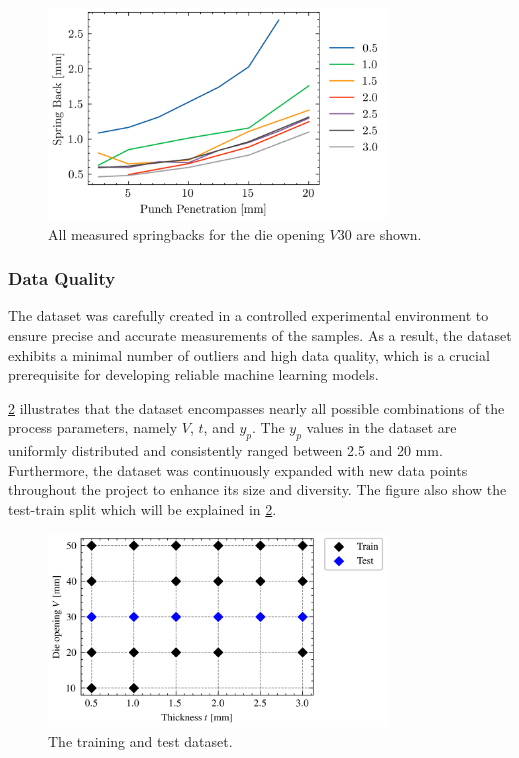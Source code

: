 {\begin{figure}[h]
    \begin{tcolorbox}[arc=0pt,boxrule=0.5pt]
        \centering
        \includegraphics[width=0.8\textwidth]{chap4/images/all-springbacks-consolidated}
    \end{tcolorbox}
    \caption{All measured springbacks for the die opening $V30$ are shown. }
    \label{fig:v30_springbacks}
\end{figure}

\subsubsection{Data Quality}
The dataset was carefully created in a controlled experimental environment to ensure precise and accurate
measurements of the samples.
As a result, the dataset exhibits a minimal number of outliers and high data quality,
which is a crucial prerequisite for developing reliable machine learning models.

\cref{fig:train_test_split} illustrates that the dataset encompasses nearly all possible combinations of the
process parameters, namely $V$, $t$, and $y_p$.
The $y_p$ values in the dataset are uniformly distributed and consistently ranged between 2.5 and 20 mm.
Furthermore, the dataset was continuously expanded with new data points throughout the project to enhance its size and
diversity.
The figure also show the test-train split which will be explained in \cref{fig:train_test_split}.

\begin{figure}[h]
    \begin{tcolorbox}[arc=0pt,boxrule=0.5pt]
        \centering
        \includegraphics[width=0.8\textwidth]{chap4/images/test_train_split}
    \end{tcolorbox}
    \caption{The training and test dataset.}
    \label{fig:train_test_split}
\end{figure}

}
